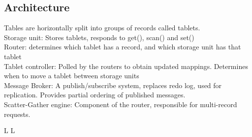 \subsection{Architecture}
Tables are horizontally split into groups of records called tablets. \\
Storage unit: Stores tablets, responds to get(), scan() and set()\\
Router: determines which tablet has a record, and which storage unit has that tablet\\
Tablet controller: Polled by the routers to obtain updated mappings. Determines when to move a tablet between storage units\\
Message Broker: A publish/subscribe system, replaces redo log, used for replication. Provides partial ordering of published messages.\\
Scatter-Gather engine: Component of the router, responsible for multi-record requests.

\vfill \smallskip
\supereject
\if L\lr \else\null\vfill\eject\fi
\if L\lr \else\null\vfill\eject\fi
\bye


